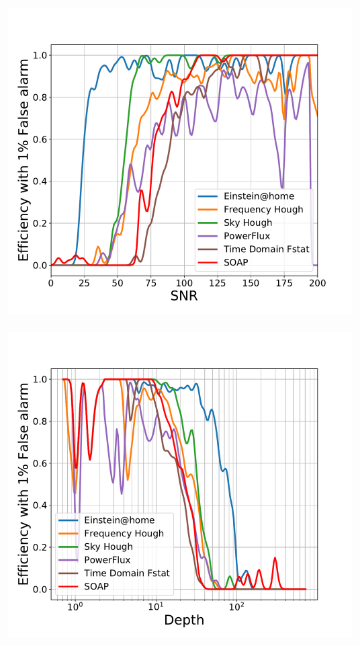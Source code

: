 \begin{figure}
	\begin{subfigure}[h]{0.5\textwidth}
		\includegraphics[width=\columnwidth]{C4_cnn/S6MDC_snr.pdf}
		\label{machine:results:snr_s6mdc}
	\end{subfigure}
\begin{subfigure}[h]{0.5\textwidth}
	\includegraphics[width=\columnwidth]{C4_cnn/S6MDC_depth.pdf}
	\label{machine:results:mdccomp}
\end{subfigure}


\end{figure}
